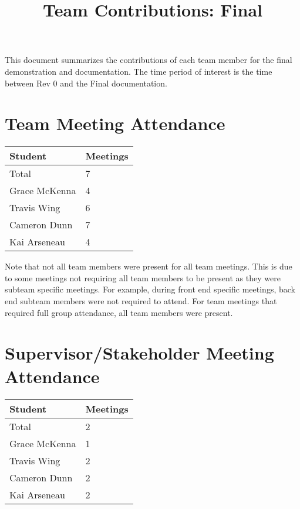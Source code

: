 \documentclass{article}
\title{Team Contributions: Final\\\progname}
\author{\authname}
\date{}
\begin{document}
\maketitle

This document summarizes the contributions of each team member for the final
demonstration and documentation.  The time period of interest is the time
between Rev 0 and the Final documentation.

\section{Team Meeting Attendance}

\begin{table}[H]
\centering
\begin{tabular}{ll}
\toprule
\textbf{Student} & \textbf{Meetings}\\
\midrule
Total & 7\\
Grace McKenna & 4\\
Travis Wing & 6\\
Cameron Dunn & 7\\
Kai Arseneau & 4\\
\bottomrule
\end{tabular}
\end{table}

Note that not all team members were present for all team meetings. This is due to some meetings not requiring all team members to be present as they were subteam specific meetings.
For example, during front end specific meetings, back end subteam members were not required to attend. For team meetings that required full group attendance, all team members were present.

\section{Supervisor/Stakeholder Meeting Attendance}

\begin{table}[H]
\centering
\begin{tabular}{ll}
\toprule
\textbf{Student} & \textbf{Meetings}\\
\midrule
Total & 2 \\
Grace McKenna & 1\\
Travis Wing & 2\\
Cameron Dunn & 2\\
Kai Arseneau & 2\\
\bottomrule
\end{tabular}
\end{table}
\end{document}
